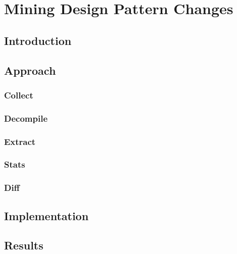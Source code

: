\chapter{Mining Design Pattern Changes}
\label{mining_design_changes_chapter}

\section{Introduction}

\section{Approach}

\subsection{Collect}

\subsection{Decompile}

\subsection{Extract}

\subsection{Stats}

\subsection{Diff}

\section{Implementation }

\section{Results}


